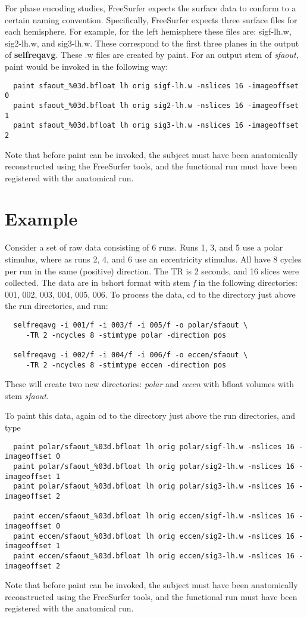 \documentclass[10pt]{article}
\begin{document}
For phase encoding studies, FreeSurfer expects the surface data to
conform to a certain naming convention.  Specifically, FreeSurfer
expects three surface files for each hemisphere.  For example, for the
left hemisphere these files are: sigf-lh.w, sig2-lh.w, and
sig3-lh.w. These correspond to the first three planes in the output of
{\bf selfreqavg}.  These .w files are created by paint.  For an output
stem of {\em sfaout}, paint would be invoked in the following way:
\begin{verbatim}
  paint sfaout_%03d.bfloat lh orig sigf-lh.w -nslices 16 -imageoffset 0 
  paint sfaout_%03d.bfloat lh orig sig2-lh.w -nslices 16 -imageoffset 1 
  paint sfaout_%03d.bfloat lh orig sig3-lh.w -nslices 16 -imageoffset 2 
\end{verbatim}
Note that before paint can be invoked, the subject must have been
anatomically reconstructed using the FreeSurfer tools, and the
functional run must have been registered with the anatomical run.

\section{Example}

Consider a set of raw data consisting of 6 runs. Runs 1, 3, and 5 use
a polar stimulus, where as runs 2, 4, and 6 use an eccentricity
stimulus. All have 8 cycles per run in the same (positive) direction.
The TR is 2 seconds, and 16 slices were collected.  The data are in
bshort format with stem {\em f} in the following directories: 001,
002, 003, 004, 005, 006.  To process the data, cd to the directory
just above the run directories, and run:
\begin{verbatim}
  selfreqavg -i 001/f -i 003/f -i 005/f -o polar/sfaout \
     -TR 2 -ncycles 8 -stimtype polar -direction pos 

  selfreqavg -i 002/f -i 004/f -i 006/f -o eccen/sfaout \
     -TR 2 -ncycles 8 -stimtype eccen -direction pos 
\end{verbatim}
These will create two new directories: {\em polar} and {\em eccen}
with bfloat volumes with stem {\em sfaout}.

To paint this data, again cd to the directory just above the run
directories, and type 
\begin{verbatim}
  paint polar/sfaout_%03d.bfloat lh orig polar/sigf-lh.w -nslices 16 -imageoffset 0 
  paint polar/sfaout_%03d.bfloat lh orig polar/sig2-lh.w -nslices 16 -imageoffset 1 
  paint polar/sfaout_%03d.bfloat lh orig polar/sig3-lh.w -nslices 16 -imageoffset 2 

  paint eccen/sfaout_%03d.bfloat lh orig eccen/sigf-lh.w -nslices 16 -imageoffset 0 
  paint eccen/sfaout_%03d.bfloat lh orig eccen/sig2-lh.w -nslices 16 -imageoffset 1 
  paint eccen/sfaout_%03d.bfloat lh orig eccen/sig3-lh.w -nslices 16 -imageoffset 2 
\end{verbatim}
Note that before paint can be invoked, the subject must have been
anatomically reconstructed using the FreeSurfer tools, and the
functional run must have been registered with the anatomical run.
\end{document}
